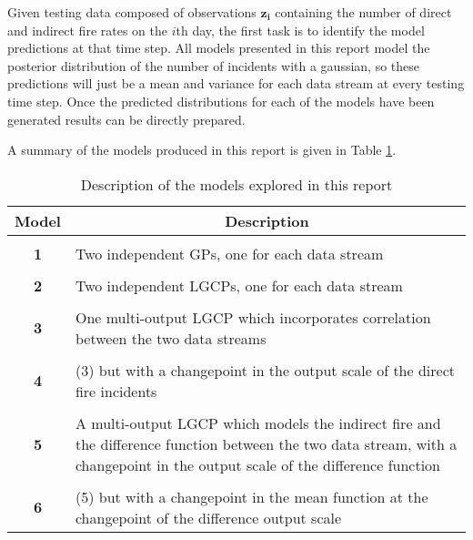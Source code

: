 \documentclass[a4paper,11pt]{report}
\begin{document}
Given testing data composed of observations \(\mathbf{z_i}\) containing the number of direct and indirect fire rates on the \(i\)th day, the first task is to identify the model predictions at that time step. All models presented in this report model the posterior distribution of the number of incidents with a gaussian, so these predictions will just be a mean and variance for each data stream at every testing time step. Once the predicted distributions for each of the models have been generated results can be directly prepared.

A summary of the models produced in this report is given in Table \ref{tab:model-description}.

\begin{table}[]
\caption{Description of the models explored in this report}
\label{tab:model-description}
\centering
\begin{tabular}{c|p{14cm}}
\textbf{Model} & \multicolumn{1}{c}{\textbf{Description}}                                                                                                                                                          \\ \hline
& \\
\bf{1}              & Two independent GPs, one for each data stream                                                                                                                                 \\
& \\
\bf{2}              & Two independent LGCPs, one for each data stream                                                                                                                               \\
& \\
\bf{3}              & One multi-output LGCP which incorporates correlation between the two data streams                                                                                             \\
& \\
\bf{4}              & (3) but with a changepoint in the output scale of the direct fire incidents                                                                                                   \\
& \\
\bf{5}              & A multi-output LGCP which models the indirect fire and the difference function between the two data stream, with a changepoint in the output scale of the difference function \\
& \\
\bf{6}              & (5) but with a changepoint in the mean function at the changepoint of the difference output scale                                                                            
\end{tabular}
\end{table}
\end{document}
